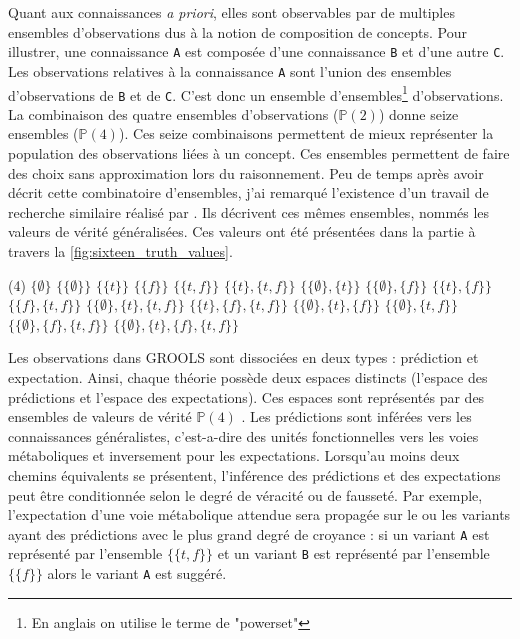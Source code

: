 \begin{refsegment}
Quant aux connaissances \textit{a priori}, elles sont observables par de multiples ensembles d'observations dus à la notion de composition de concepts. Pour illustrer, une connaissance \texttt{A} est composée d'une connaissance \texttt{B} et d'une autre \texttt{C}. Les observations relatives à la connaissance \texttt{A} sont l'union des ensembles d'observations de \texttt{B} et de \texttt{C}. C'est donc un ensemble d'ensembles\footnote{En anglais on utilise le terme de "powerset"} d'observations. La combinaison des quatre ensembles d'observations ($\mathbb{P}(2)$) donne seize ensembles ($\mathbb{P}(4)$). Ces seize combinaisons permettent de mieux représenter la population des observations liées à un concept. Ces ensembles permettent de faire des choix sans approximation lors du raisonnement. Peu de temps après avoir décrit cette combinatoire d'ensembles, j'ai remarqué l'existence d'un travail de recherche similaire réalisé par \citeauthor{shramko2005some}. Ils décrivent ces mêmes ensembles, nommés les valeurs de vérité généralisées. Ces valeurs ont été présentées dans la partie   à travers la \cref{fig:sixteen_truth_values}.

\begin{tasks}[counter-format = {tsk[1].},label-offset = {0.8em},label-format = {\bfseries}](4)
	\task $\{\emptyset\}$
	\task $\{\{\emptyset\}\}$
	\task $\{\{t\}\}$
	\task $\{\{f\}\}$
	\task $\{\{t,f\}\}$
	\task $\{\{t\},\{t,f\}\}$
	\task $\{\{\emptyset\},\{t\}\}$
	\task $\{\{\emptyset\},\{f\}\}$
	\task $\{\{t\},\{f\}\}$
	\task $\{\{f\},\{t,f\}\}$
	\task $\{\{\emptyset\},\{t\},\{t,f\}\}$
	\task $\{\{t\},\{f\},\{t,f\}\}$
	\task $\{\{\emptyset\},\{t\},\{f\}\}$
	\task $\{\{\emptyset\},\{t,f\}\}$
	\task $\{\{\emptyset\},\{f\},\{t,f\}\}$
	\task $\{\{\emptyset\},\{t\},\{f\},\{t,f\}\}$
\end{tasks}

Les observations dans GROOLS sont dissociées en deux types : prédiction et expectation. Ainsi, chaque théorie possède deux espaces distincts (l'espace des prédictions et l'espace des expectations). Ces espaces sont représentés par des ensembles de valeurs de vérité $\mathbb{P}(4)$ . Les prédictions sont inférées vers les connaissances généralistes, c'est-a-dire des unités fonctionnelles vers les voies métaboliques et inversement pour les expectations. Lorsqu'au moins deux chemins équivalents se présentent, l'inférence des prédictions et des expectations peut être conditionnée selon le degré de véracité ou de fausseté. Par exemple, l'expectation d'une voie métabolique attendue sera propagée sur le ou les variants ayant des prédictions avec le plus grand degré de croyance : si un variant \texttt{A} est représenté par l'ensemble $\{\{t,f\}\}$ et un variant  \texttt{B} est représenté par l'ensemble $\{\{f\}\}$ alors le variant \texttt{A} est suggéré.


\end{refsegment}
